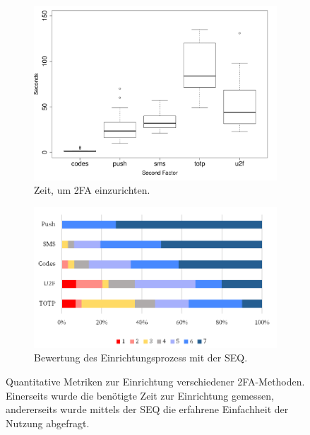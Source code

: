 \begin{figure}[!ht]
  \centering
  \begin{subfigure}{.40\textwidth}
    \includegraphics[width=\linewidth]{assets/setup-time.png}
    \caption{Zeit, um \acs{2FA} einzurichten.}
    \label{fig:setup-time}
  \end{subfigure}
  \hspace{.025\textwidth}
  \begin{subfigure}{.525\textwidth}
    \includegraphics[width=\linewidth]{assets/setup-seq.png}
    \caption{Bewertung des Einrichtungsprozess mit der \acs{SEQ}.}
    \label{fig:setup-seq}
  \end{subfigure}
  \caption[Quantitative Metriken zur Einrichtung verschiedener \acs{2FA}-Methoden]{Quantitative Metriken zur Einrichtung verschiedener \acs{2FA}-Methoden. Einerseits wurde die benötigte Zeit zur Einrichtung gemessen, andererseits wurde mittels der \acf{SEQ} die erfahrene Einfachheit der Nutzung abgefragt.\\\parencite[367,368]{reeseUsabilityStudy2019}}
  \label{fig:setup}
\end{figure}

